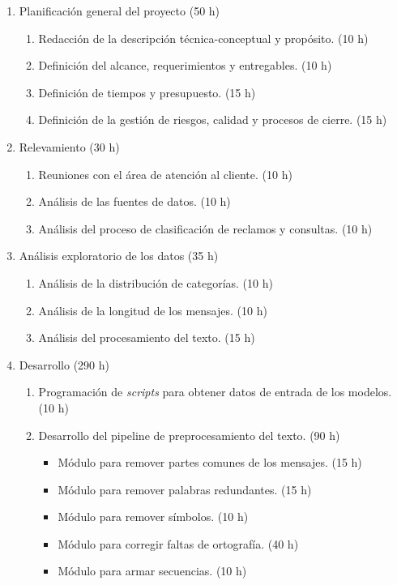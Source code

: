 \documentclass[
11pt, %
]{charter}
\begin{document}
\begin{enumerate}
	\item Planificación general del proyecto (50 h)
		\begin{enumerate}
			\item Redacción de la descripción técnica-conceptual y propósito. (10 h)
			\item Definición del alcance, requerimientos y entregables. (10 h)
			\item Definición de tiempos y presupuesto. (15 h)
			\item Definición de la gestión de riesgos, calidad y procesos de cierre. (15 h)
		\end{enumerate}
	\item Relevamiento (30 h)
		\begin{enumerate}
			\item Reuniones con el área de atención al cliente. (10 h)
			\item Análisis de las fuentes de datos. (10 h)
			\item Análisis del proceso de clasificación de reclamos y consultas. (10 h)
		\end{enumerate}
	\item Análisis exploratorio de los datos (35 h)
		\begin{enumerate}
			\item Análisis de la distribución de categorías. (10 h) 
			\item Análisis de la longitud de los mensajes. (10 h)
			\item Análisis del procesamiento del texto. (15 h)
		\end{enumerate}
	\item Desarrollo (290 h)
		\begin{enumerate}
			\item Programación de \textit{scripts} para obtener datos de entrada de los modelos. (10 h)
			\item Desarrollo del pipeline de preprocesamiento del texto. (90 h)
				\begin{itemize}
					\item Módulo para remover partes comunes de los mensajes. (15 h)
					\item Módulo para remover palabras redundantes. (15 h)
					\item Módulo para remover símbolos. (10 h)
					\item Módulo para corregir faltas de ortografía. (40 h)
					\item Módulo para armar secuencias. (10 h)

\end{itemize}
\end{enumerate}
\end{enumerate}
\end{document}
